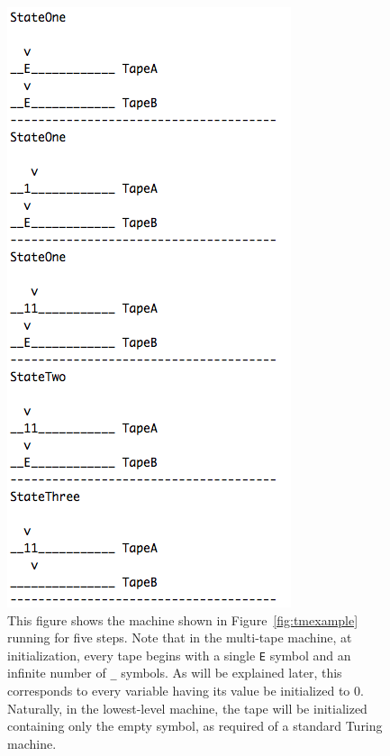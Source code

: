 \documentclass{report}
\begin{document}
\begin{figure} 
\begin{center} 
\includegraphics[scale=0.8]{figs/behavior.png} 
\caption{This figure shows the machine shown in Figure~\ref{fig:tmexample} running for five steps. Note that in the multi-tape machine, at initialization, every tape begins with a single \texttt{E} symbol and an infinite number of \texttt{\_} symbols. As will be explained later, this corresponds to every variable having its value be initialized to 0. Naturally, in the lowest-level machine, the tape will be initialized containing only the empty symbol, as required of a standard Turing machine. \label{fig:example}} 
\end{center} 
\end{figure}
\end{document}
